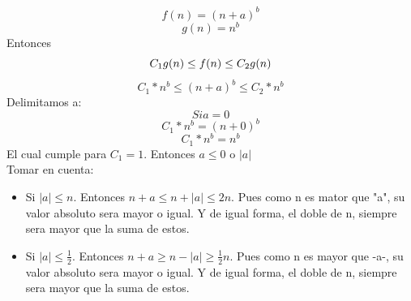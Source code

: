 \documentclass[10pt,a4paper]{article}
\begin{document}
\begin{itemize}
			\begin{equation*}
				 f(n) = (n + a)^{b} 
			\end{equation*}
			\begin{equation*}
				 g(n) = n^{b}
			\end{equation*}
			Entonces
			\begin{equation*}
					C_{1}g(n) \leq  f(n) \leq C_{2}g(n)\\
			\end{equation*}
			\begin{equation*}
				C_{1}*n^{b} \leq  (n + a)^{b} \leq C_{2}* n^{b} 
			\end{equation*}
			Delimitamos a:
			\begin{equation*}
				Si a = 0 
			\end{equation*}
			\begin{equation*}
				C_{1}*n^{b} = (n+0)^{b}
			\end{equation*}
			\begin{equation*}
				C_{1}*n^{b} = n^{b}
			\end{equation*}
			 El cual cumple para $C_{1} = 1$. Entonces $a \leq 0$ o $\left |a  \right |$\\
			 Tomar en cuenta:
			 \begin{itemize}
			 	\item Si $\left |a  \right | \leq n $. Entonces $ n + a \leq n + \left |a  \right | \leq 2n$. Pues como n es mator que "a", su valor absoluto sera mayor o igual. Y de igual forma, el doble de n, siempre sera mayor que la suma de estos. \\
			 	\item Si $\left |a  \right | \leq \frac{1}{2} $. Entonces $ n + a \geq  n - \left |a  \right | \geq  \frac{1}{2}n$. Pues como n es mayor que -a-, su valor absoluto sera mayor o igual. Y de igual forma, el doble de n, siempre sera mayor que la suma de estos. \\
			 \end{itemize}
			 

\end{itemize}
\end{document}
